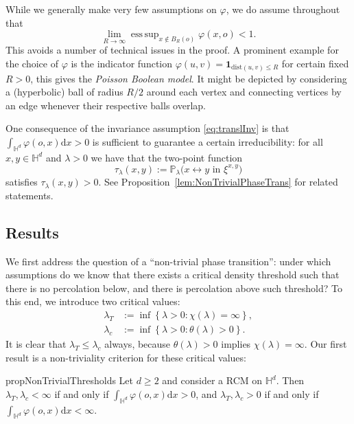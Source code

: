 \documentclass[10pt,a4paper,dvipsnames]{article}
\theoremstyle{definition}
\theoremstyle{remark}
\newcommand{\pla}{\mathbb P_\lambda}
\newcommand{\HypDim}{{\mathbb{H}^d}}
\newcommand{\dd}{\mathrm{d}} %
\DeclareMathOperator*{\esssup}{ess\,sup}
\newcommand{\conn}[3]{#1 \longleftrightarrow #2\textrm { in } #3}
\newcommand{\tlam}{\tau_\lambda}
\newcommand{\dist}[1]{\mathrm{dist}\left(#1\right)}
\newcommand{\orig}{o}
\newcommand{\connf}{\varphi}
\numberwithin{equation}{section}
\begin{document}
While we generally make very few assumptions on $\connf$, we do assume throughout that 
\begin{equation}
\label{eqn:longdistanceassumption}
    \lim_{R\to\infty}\esssup_{x\not\in B_R\left(\orig\right)}\connf(x,\orig)<1.
\end{equation}
This avoids a number of technical issues in the proof. 
A prominent example for the choice of $\connf$ is the indicator function $\connf(u,v)=\mathbf1_{\dist{u,v}\le R}$ for certain fixed $R>0$, this gives the \emph{Poisson Boolean model}. It might be depicted by considering a (hyperbolic) ball of radius $R/2$ around each vertex and connecting vertices by an edge whenever their respective balls overlap. 

One consequence of the invariance assumption \eqref{eq:translInv} is that $\int_\HypDim\connf(\orig,x)\dd x >0$ is sufficient to guarantee a certain irreducibility: for all $x,y\in\HypDim$ and $\lambda>0$ we have that the two-point function 
\begin{equation}\label{eq:TwoPt}
    \tlam(x,y):=\pla\big(\conn xy{\xi^{x,y}}\big)
\end{equation} 
satisfies $\tlam(x,y)>0$. See Proposition~\ref{lem:NonTrivialPhaseTrans} for related statements. 



\subsection{Results}
We first address the question of a ``non-trivial phase transition'': under which assumptions do we know that there exists a critical density threshold such that there is no percolation below, and there is percolation above such threshold? To this end, we introduce two critical values: 
\begin{align}
    \lambda_T &:= \inf\left\{\lambda>0\colon \chi\left(\lambda\right)=\infty\right\},\\
    \lambda_c &:= \inf\left\{\lambda>0\colon \theta\left(\lambda\right)>0\right\}.
\end{align}
It is clear that $\lambda_T\le \lambda_c$ always, because $\theta\left(\lambda\right)>0$ implies $\chi\left(\lambda\right)=\infty$. 
Our first result is a non-triviality criterion for these critical values: 
\begin{restatable}{prop}{NonTrivialThresholds}
\label{lem:NonTrivialPhaseTrans}
    Let $d\geq 2$ and consider a RCM on $\HypDim$. Then $\lambda_T,\lambda_c<\infty$ if and only if $\int_\HypDim\connf(\orig,x)\dd x >0$, and $\lambda_T,\lambda_c>0$ if and only if $\int_\HypDim\connf(\orig,x)\dd x <\infty$.
\end{restatable}
\end{document}
